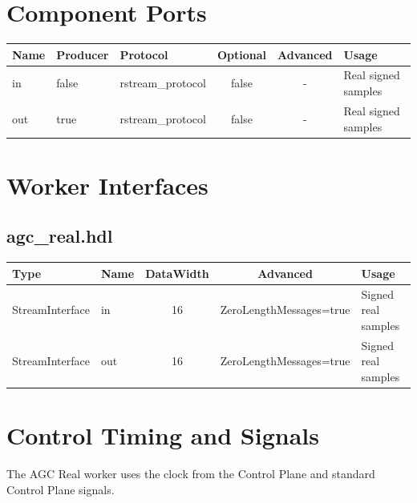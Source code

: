 \documentclass{article}
\def\comp{agc\_real}
\def\Comp{AGC Real}
\begin{document}
\begin{landscape}
	\section*{Component Ports}
	\begin{scriptsize}
		\begin{tabular}{|M{2cm}|M{1.5cm}|M{4cm}|c|c|M{9cm}|}
			\hline
			Name & Producer & Protocol          & Optional & Advanced & Usage               \\
			\hline
			in   & false    & rstream\_protocol & false    & -        & Real signed samples \\
			\hline
			out  & true     & rstream\_protocol & false    & -        & Real signed samples \\
			\hline
		\end{tabular}
	\end{scriptsize}

	\section*{Worker Interfaces}
	\subsection*{\comp.hdl}
	\begin{scriptsize}
		\begin{tabular}{|M{2cm}|M{1.5cm}|c|c|M{12cm}|}
			\hline
			\rowcolor{blue}
			Type            & Name & DataWidth & Advanced                & Usage               \\
			\hline
			StreamInterface & in   & 16        & ZeroLengthMessages=true & Signed real samples \\
			\hline
			StreamInterface & out  & 16        & ZeroLengthMessages=true & Signed real samples \\
			\hline
		\end{tabular}
	\end{scriptsize}
\end{landscape}

\section*{Control Timing and Signals}
\begin{flushleft}
	The {\Comp} worker uses the clock from the Control Plane and standard Control Plane signals.
\end{flushleft}
\end{document}
